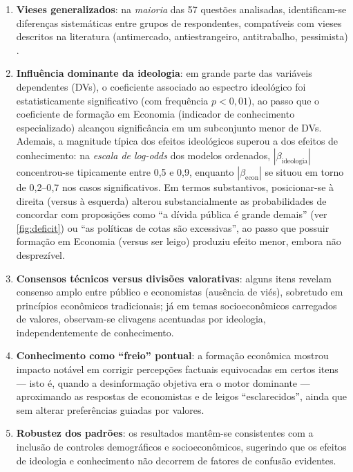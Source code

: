\begin{enumerate}[label=\alph*)]

    \item \textbf{Vieses generalizados}: na \textit{maioria} das 57 questões analisadas, identificam-se diferenças sistemáticas entre grupos de respondentes, compatíveis com vieses descritos na literatura (antimercado, antiestrangeiro, antitrabalho, pessimista) \cite{The_Myth_of_the_Rational_Voter}.

    \item \textbf{Influência dominante da ideologia}: em grande parte das variáveis dependentes (DVs), o coeficiente associado ao espectro ideológico foi estatisticamente significativo (com frequência \(p<0{,}01\)), ao passo que o coeficiente de formação em Economia (indicador de conhecimento especializado) alcançou significância em um subconjunto menor de DVs. Ademais, a magnitude típica dos efeitos ideológicos superou a dos efeitos de conhecimento: na \textit{escala de log-odds} dos modelos ordenados, \(|\beta_{\text{ideologia}}|\) concentrou-se tipicamente entre 0{,}5 e 0{,}9, enquanto \(|\beta_{\text{econ}}|\) se situou em torno de 0{,}2–0{,}7 nos casos significativos. Em termos substantivos, posicionar-se à direita (versus à esquerda) alterou substancialmente as probabilidades de concordar com proposições como “a dívida pública é grande demais” (ver \autoref{fig:deficit}) ou “as políticas de cotas são excessivas”, ao passo que possuir formação em Economia (versus ser leigo) produziu efeito menor, embora não desprezível.
    
    \item \textbf{Consensos técnicos versus divisões valorativas}: alguns itens revelam consenso amplo entre público e economistas (ausência de viés), sobretudo em princípios econômicos tradicionais; já em temas socioeconômicos carregados de valores, observam-se clivagens acentuadas por ideologia, independentemente de conhecimento.
    
    \item \textbf{Conhecimento como “freio” pontual}: a formação econômica mostrou impacto notável em corrigir percepções factuais equivocadas em certos itens — isto é, quando a desinformação objetiva era o motor dominante — aproximando as respostas de economistas e de leigos “esclarecidos”, ainda que sem alterar preferências guiadas por valores.
    
    \item \textbf{Robustez dos padrões}: os resultados mantêm-se consistentes com a inclusão de controles demográficos e socioeconômicos, sugerindo que os efeitos de ideologia e conhecimento não decorrem de fatores de confusão evidentes.
\end{enumerate}


